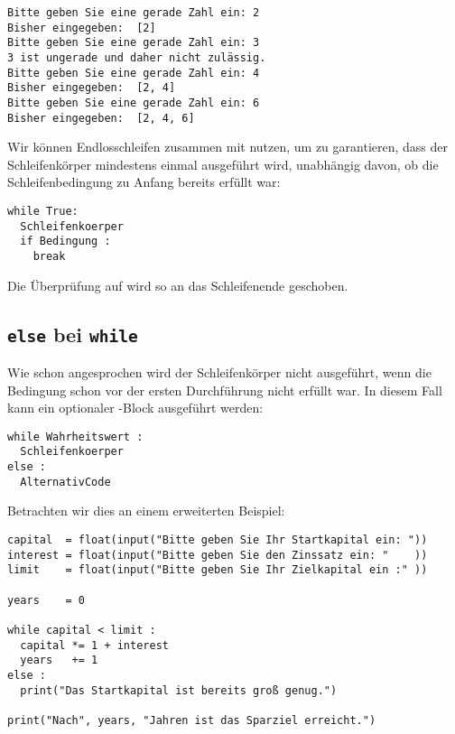 \begin{cmdbox}
\begin{verbatim}
Bitte geben Sie eine gerade Zahl ein: 2
Bisher eingegeben:  [2]
Bitte geben Sie eine gerade Zahl ein: 3
3 ist ungerade und daher nicht zulässig.
Bitte geben Sie eine gerade Zahl ein: 4
Bisher eingegeben:  [2, 4]
Bitte geben Sie eine gerade Zahl ein: 6
Bisher eingegeben:  [2, 4, 6]
\end{verbatim}
\end{cmdbox}

\begin{hintbox}
Wir können Endlosschleifen zusammen mit  nutzen, um zu garantieren, dass der Schleifenkörper mindestens einmal ausgeführt wird, unabhängig davon, ob die Schleifenbedingung zu Anfang bereits erfüllt war:
\begin{codebox}
\begin{verbatim}
while True:
  Schleifenkoerper
  if Bedingung :
    break
\end{verbatim}
\end{codebox}
Die Überprüfung auf  wird so an das Schleifenende geschoben.
\end{hintbox}


\subsection{\texttt{else} bei \texttt{while}}
Wie schon angesprochen wird der Schleifenkörper nicht ausgeführt, wenn die Bedingung schon vor der ersten Durchführung nicht erfüllt war. In diesem Fall kann ein optionaler -Block ausgeführt werden:

\begin{codebox}
\begin{verbatim}
while Wahrheitswert :
  Schleifenkoerper
else :
  AlternativCode
\end{verbatim}
\end{codebox}

Betrachten wir dies an einem erweiterten Beispiel:
\begin{codebox}
\begin{verbatim}
capital  = float(input("Bitte geben Sie Ihr Startkapital ein: "))
interest = float(input("Bitte geben Sie den Zinssatz ein: "    ))
limit    = float(input("Bitte geben Sie Ihr Zielkapital ein :" ))

years    = 0

while capital < limit :
  capital *= 1 + interest
  years   += 1
else :
  print("Das Startkapital ist bereits groß genug.")
  
print("Nach", years, "Jahren ist das Sparziel erreicht.")
\end{verbatim}
\end{codebox}

